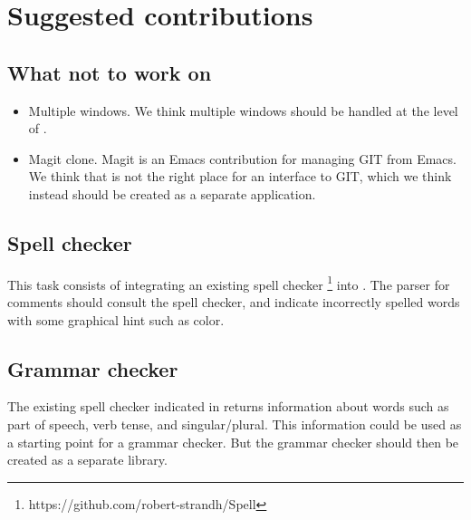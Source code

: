 \chapter{Suggested contributions}

\section{What not to work on}

\begin{itemize}
\item Multiple windows.  We think multiple windows should be handled
  at the level of \mcclim{}.
\item Magit clone.  Magit is an Emacs contribution for managing GIT
  from Emacs.  We think that \sysname{} is not the right place for an
  interface to GIT, which we think instead should be created as a
  separate \clim{} application.
\end{itemize}

\section{Spell checker}
\label{suggested-contribution-spell-checker}

This task consists of integrating an existing spell checker%
\footnote{https://github.com/robert-strandh/Spell}
into \sysname{}.  The parser for \commonlisp{} comments should consult
the spell checker, and indicate incorrectly spelled words with some
graphical hint such as color.

\section{Grammar checker}

The existing spell checker indicated in
 returns information
about words such as part of speech, verb tense, and singular/plural.
This information could be used as a starting point for a grammar
checker.  But the grammar checker should then be created as a separate
library.
